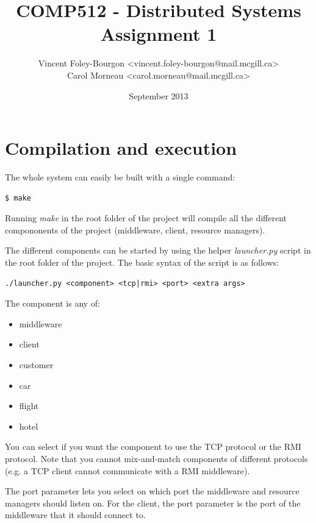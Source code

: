 \documentclass[11pt]{article}
\begin{document}
\title{COMP512 - Distributed Systems \\ Assignment 1}
\author{
  Vincent Foley-Bourgon <vincent.foley-bourgon@mail.mcgill.ca> \\
  Carol Morneau <carol.morneau@mail.mcgill.ca>
}
\date{September 2013}

\maketitle

\section{Compilation and execution}

The whole system can easily be built with a single command:


\begin{verbatim}
$ make
\end{verbatim}

Running {\it make} in the root folder of the project will compile
all the different compononents of the project (middleware, client,
resource managers).

The different components can be started by using the helper {\it
  launcher.py} script in the root folder of the project.  The basic
syntax of the script is as follows:


\begin{verbatim}
./launcher.py <component> <tcp|rmi> <port> <extra args>
\end{verbatim}

The component is any of:

\begin{itemize}
\item middleware
\item client
\item customer
\item car
\item flight
\item hotel
\end{itemize}

You can select if you want the component to use the TCP protocol or
the RMI protocol.  Note that you cannot mix-and-match components of
different protocols (e.g. a TCP client cannot communicate with a RMI
middleware).

The port parameter lets you select on which port the middleware and
resource managers should listen on.  For the client, the port
parameter is the port of the middleware that it should connect to.
\end{document}
